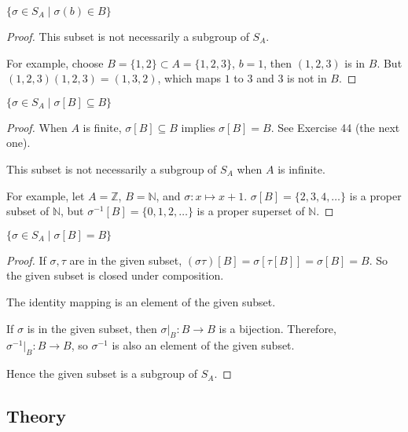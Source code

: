 \newpage
\begin{exercise}
    $\{ \sigma \in S_{A} \mid \sigma(b) \in B \}$
\end{exercise}

\begin{proof}
    This subset is not necessarily a subgroup of $S_{A}$.

    For example, choose $B = \{ 1, 2 \} \subset A = \{ 1, 2, 3 \}$, $b = 1$, then $(1, 2, 3)$ is in $B$. But $(1, 2, 3)(1, 2, 3) = (1, 3, 2)$, which maps $1$ to $3$ and $3$ is not in $B$.
\end{proof}

\newpage
\begin{exercise}
    $\{ \sigma \in S_{A} \mid \sigma[B] \subseteq B \}$
\end{exercise}

\begin{proof}
    When $A$ is finite, $\sigma[B] \subseteq B$ implies $\sigma[B] = B$. See Exercise 44 (the next one).

    This subset is not necessarily a subgroup of $S_{A}$ when $A$ is infinite.

    For example, let $A = \mathbb{Z}$, $B = \mathbb{N}$, and $\sigma: x \mapsto x + 1$. $\sigma[B] = \{ 2, 3, 4, \ldots \}$ is a proper subset of $\mathbb{N}$, but $\sigma^{-1}[B] = \{ 0, 1, 2, \ldots \}$ is a proper superset of $\mathbb{N}$.
\end{proof}

\newpage
\begin{exercise}
    $\{ \sigma \in S_{A} \mid \sigma[B] = B \}$
\end{exercise}

\begin{proof}
    If $\sigma, \tau$ are in the given subset, $(\sigma\tau)[B] = \sigma[\tau[B]] = \sigma[B] = B$. So the given subset is closed under composition.

    The identity mapping is an element of the given subset.

    If $\sigma$ is in the given subset, then $\sigma\vert_{B}: B \to B$ is a bijection. Therefore, $\sigma^{-1}\vert_{B}: B \to B$, so $\sigma^{-1}$ is also an element of the given subset.

    Hence the given subset is a subgroup of $S_{A}$.
\end{proof}

\subsection*{Theory}

